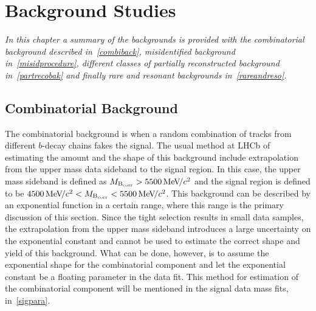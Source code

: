 \chapter{Background Studies}
\label{chap:back}


\textit{In this chapter a summary of the backgrounds is provided with the combinatorial background described in~\autoref{combiback}, misidentified background in~\autoref{misidprocedure}, different classes of partially reconstructed background in~\autoref{partrecobak} and finally rare and resonant backgrounds in~\autoref{rareandreso}.}

\section{Combinatorial Background}
\label{combiback}
The combinatorial background is when a random combination of tracks from different $b$-decay chains fakes the signal. The usual method at \gls{LHCb} of estimating the amount and the shape of this background include extrapolation from the upper mass data sideband to the signal region. In this case, the upper mass sideband is defined as $M_{\rm{B_{corr}}} > 5500 {\mathrm{\,Me\kern -0.1em V\!/}c^2}$ and the signal region is defined to be $ 4500 {\mathrm{\,Me\kern -0.1em V\!/}c^2} <M_{\rm{B_{corr}}} < 5500 {\mathrm{\,Me\kern -0.1em V\!/}c^2}$. This background can be described by an exponential function in a certain range, where this range is the primary discussion of this section. Since the tight selection results in small data samples, the extrapolation from the upper mass sideband introduces a large uncertainty on the exponential constant and cannot be used to estimate the correct shape and yield of this background. What can be done, however, is to assume the exponential shape for the combinatorial component and let the exponential constant be a floating parameter in the data fit. This method for estimation of the combinatorial component will be mentioned in the signal data mass fits, in~\autoref{sigpara}. 

